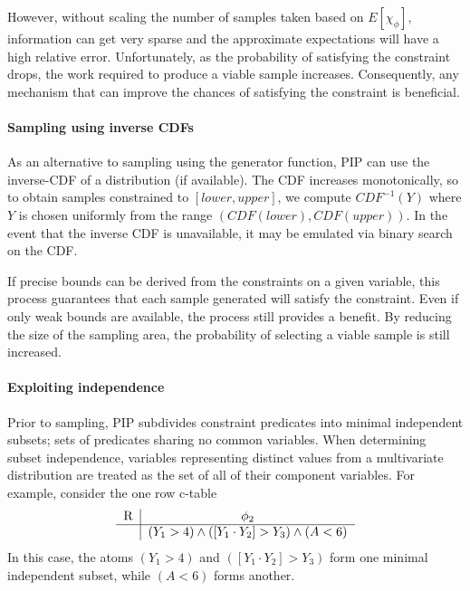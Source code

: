 However, without scaling the number of samples taken based on $E[\chi_\phi]$, information can get very sparse and the approximate expectations will have a high relative error.  Unfortunately, as the probability of satisfying the constraint drops, the work required to produce a viable sample increases.   Consequently, any mechanism that can improve the chances of satisfying the constraint is beneficial.

\paragraph{Sampling using inverse CDFs}
\label{subsec:icdf}
As an alternative to sampling using the generator function, PIP can use the inverse-CDF of a distribution (if available).  The CDF increases monotonically, so to obtain samples constrained to $[lower, upper]$, we compute $CDF^{-1}(Y)$ where $Y$ is chosen uniformly  from the range $(CDF(lower), CDF(upper))$.  In the event that the inverse CDF is unavailable, it may be emulated via binary search on the CDF.


If precise bounds can be derived from the constraints on a given variable, this process guarantees that each sample generated will satisfy the constraint.  Even if only weak bounds are available, the process still provides a benefit.  By reducing the size of the sampling area, the probability of selecting a viable sample is still increased.  

\paragraph{Exploiting independence}
\label{subsec:independence}
Prior to sampling, PIP subdivides constraint predicates into minimal independent subsets; sets of predicates sharing no common variables.  When determining subset independence, variables representing distinct values from a multivariate distribution are treated as the set of all of their component variables.  For example, consider the one row c-table 
\[
\begin{tabular}{c|c}
R & $\phi_2$ \\
\hline
& $(Y_1 > 4) \wedge ([Y_1\cdot Y_2] > Y_3) \wedge (A < 6)$ \\
\end{tabular}
\]
In this case, the atoms $(Y_1 > 4)$ and $([Y_1\cdot Y_2] > Y_3)$ form one minimal independent subset, while $(A < 6)$ forms another.

